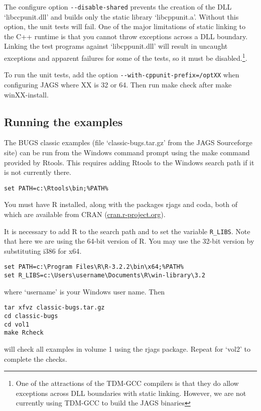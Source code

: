\documentclass[11pt, a4paper, titlepage]{article}
\newcommand{\R}{\textsf{R}}
\newcommand{\code}[1]{{\bgroup{\normalfont\ttfamily #1}\egroup}}
\newcommand{\file}[1]{{`\normalfont\textsf{#1}'}}
\let\command=\code
\begin{document}
The configure option \verb+--disable-shared+ prevents the creation of
the DLL \file{libccpunit.dll} and builds only the static library
\file{libcppunit.a}. Without this option, the unit tests will fail.
One of the major limitations of static linking to the C++ runtime is
that you cannot throw exceptions across a DLL boundary.  Linking the
test programs against \file{libcppunit.dll} will result in uncaught
exceptions and apparent failures for some of the tests, so it must be
disabled.\footnote{One of the attractions of the TDM-GCC compilers is
  that they do allow exceptions across DLL boundaries with static
  linking. However, we are not currently using TDM-GCC to build the
  JAGS binaries}.

To run the unit tests, add the option
\verb+--with-cppunit-prefix=/optXX+ when configuring JAGS where
\code{XX} is 32 or 64. Then run \code{make check} after \code{make
  winXX-install}.

\subsection{Running the examples}

The BUGS classic examples (file \file{classic-bugs.tar.gz} from the JAGS
Sourceforge site) can be run from the Windows command prompt using
the \command{make} command provided by Rtools. This requires adding Rtools
to the Windows search path if it is not currently there.
\begin{verbatim}
set PATH=c:\Rtools\bin;%PATH%
\end{verbatim}
You must have R installed, along with the packages \code{rjags} and
\code{coda}, both of which are available from CRAN
(\url{cran.r-project.org}).

It is necessary to add R to the search path and to set the variable
\verb+R_LIBS+. Note that here we are using the 64-bit version of R.
You may use the 32-bit version by substituting \code{i386} for
\code{x64}.
\begin{verbatim}
set PATH=c:\Program Files\R\R-3.2.2\bin\x64;%PATH%
set R_LIBS=c:\Users\username\Documents\R\win-library\3.2
\end{verbatim}
where \file{username} is your Windows user name. Then
\begin{verbatim}
tar xfvz classic-bugs.tar.gz
cd classic-bugs
cd vol1
make Rcheck
\end{verbatim}
will check all examples in volume 1 using the \code{rjags} package. Repeat
for \file{vol2} to complete the checks.
\end{document}
